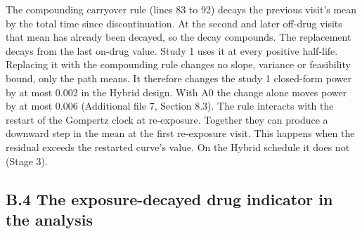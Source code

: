 \documentclass[
  11pt,
]{article}
\newenvironment{Shaded}{\begin{snugshade}}{\end{snugshade}}
\newcommand{\ControlFlowTok}[1]{\textcolor[rgb]{0.13,0.29,0.53}{\textbf{#1}}}
\newcommand{\DecValTok}[1]{\textcolor[rgb]{0.00,0.00,0.81}{#1}}
\newcommand{\FunctionTok}[1]{\textcolor[rgb]{0.13,0.29,0.53}{\textbf{#1}}}
\newcommand{\NormalTok}[1]{#1}
\newcommand{\OtherTok}[1]{\textcolor[rgb]{0.56,0.35,0.01}{#1}}
\newcommand{\SpecialCharTok}[1]{\textcolor[rgb]{0.81,0.36,0.00}{\textbf{#1}}}
\begin{document}
The compounding carryover rule (lines 83 to 92) decays the previous
visit's mean by the total time since discontinuation. At the second
and later off-drug visits that mean has already been decayed, so the
decay compounds. The replacement decays from the last on-drug value.
Study 1 uses it at every positive half-life. Replacing it with the
compounding rule changes no slope, variance or feasibility bound, only
the path means. It therefore changes the study 1 closed-form power by
at most 0.002 in the Hybrid design. With A0 the change alone moves
power by at most 0.006 (Additional file 7, Section 8.3). The rule
interacts with the restart of the Gompertz clock at re-exposure.
Together they can produce a downward step in the mean at the first
re-exposure visit. This happens when the residual exceeds the
restarted curve's value. On the Hybrid schedule it does not
(Stage 3).

\begin{Shaded}
\end{Shaded}

\subsection*{B.4 The exposure-decayed drug indicator in the analysis}\label{b.4-the-exposure-decayed-drug-indicator-in-the-analysis}
\end{document}
